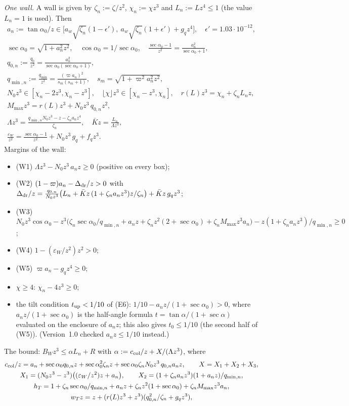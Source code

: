 \documentclass[11pt]{amsart}
\newcommand{\ta}{\tan\alpha}
\newcommand{\se}{\sec\alpha}
\newcommand{\caz}{\cos\alpha_0}
\newcommand{\taz}{\tan\alpha_0}
\newcommand{\sez}{\sec\alpha_0}
\newcommand{\Kb}{\bar K}
\theoremstyle{definition}
\theoremstyle{remark}
\numberwithin{equation}{section}
\begin{document}
\emph{One wall.} A wall is given by $\zeta_n:=\zeta/z^2$, $\chi_n:=\chi z^3$ and $L_n:=Lz^4\le1$ (the value $L_n=1$ is
used). Then
\begin{gather*}
a_n:=\taz/z\in\bigl[a_w\sqrt{\zeta_n}(1-\epsilon'),\ a_w\sqrt{\zeta_n}(1+\epsilon')+g_qz^4\bigr],\quad\epsilon'=1.03\cdot10^{-12},\\
\sez=\sqrt{1+a_n^2z^2},\quad \caz=1/\sez,\quad \frac{\sez-1}{z^2}=\frac{a_n^2}{\sez+1},\\
q_{0,n}:=\frac{q_0}{z^2}=\frac{a_n^2}{\sez(\sez+1)},\\
q_{\min,n}:=\frac{q_{\min}}{z^2}=\frac{(\varpi a_n)^2}{s_m(s_m+1)},\quad s_m=\sqrt{1+\varpi^2a_n^2z^2},\\
N_0z^3\in[\chi_n-2z^3,\chi_n-z^3],\quad \lfloor\chi\rfloor z^3\in[\chi_n-z^3,\chi_n],\quad
r(L)z^3=\chi_n+\zeta_nL_nz,\\
M_{\max}z^3=r(L)z^3+N_0z^3\,q_{0,n}z^2,\\
\Lambda z^3=\frac{q_{\min,n}N_0z^3-z-\zeta_na_nz^4}{\zeta_n},\quad \Kb z=\frac{L_n}{\Lambda z^3},\\
\frac{\varepsilon_W}{z^2}=\frac{\sez-1}{z^2}+N_0z^3\,g_q+f_qz^3 .
\end{gather*}
Margins of the wall:
\begin{itemize}
\item (W1) $\Lambda z^3-N_0z^3\,a_nz\ge0$ (positive on every box);
\item (W2) $(1-\varpi)a_n-\Delta_{\rm dr}/z>0$ with
$\Delta_{\rm dr}/z=\frac{q_{0,n}}{N_0z^3}\bigl(L_n+\Kb z\,(1+\zeta_na_nz^3)z/\zeta_n\bigr)+\Kb z\,g_qz^3$;
\item (W3) $N_0z^3\caz-z^3\bigl(\zeta_n\sez/q_{\min,n}+a_nz+\zeta_nz^2(2+\sez)+\zeta_nM_{\max}z^3a_n\bigr)
-z(1+\zeta_na_nz^3)/q_{\min,n}\ge0$;
\item (W4) $1-(\varepsilon_W/z^2)z^2>0$;
\item (W5) $\varpi a_n-g_qz^4\ge0$;
\item $\chi\ge4$: $\chi_n-4z^3\ge0$;
\item the tilt condition $t_{\rm up}<1/10$ of (E6): $1/10-a_nz/(1+\sez)>0$, where $a_nz/(1+\sez)$ is the half-angle
formula $t=\ta/(1+\se)$ evaluated on the enclosure of $a_nz$; this also gives $t_0\le1/10$ (the second half of (W5)).
(Version~1.0 checked $a_nz\le1/10$ instead.)
\end{itemize}
The bound: $B_Wz^3\le\alpha L_n+R$ with $\alpha:=c_{\rm col}/z+X/(\Lambda z^3)$, where
\begin{gather*}
c_{\rm col}/z=a_n+\sez q_{0,n}z+\sez^2\zeta_nz+\sez\zeta_nN_0z^3\,q_{0,n}a_nz,\qquad X=X_1+X_2+X_3,\\
X_1=(N_0z^3-z^3)\bigl((\varepsilon_W/z^2)z+a_n\bigr),\qquad X_2=(1+\zeta_na_nz^3)(1+a_nz)/q_{\min,n},\\
h_T=1+\zeta_n\sez/q_{\min,n}+a_nz+\zeta_nz^2(1+\sez)+\zeta_nM_{\max}z^3a_n,\\
w_Tz=z+(r(L)z^3+z^3)(q_{0,n}^2/\zeta_n+g_qz^3),
\end{gather*}
\end{document}

